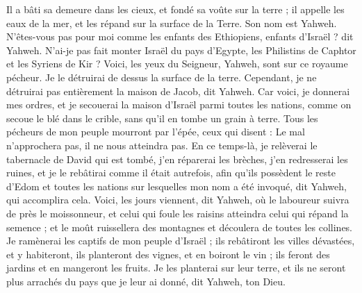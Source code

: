\begin{multicols}{2}
Il a bâti sa demeure dans les cieux, et fondé sa voûte sur la terre ; il appelle les eaux de la mer, et les répand sur la surface de la Terre. Son nom est Yahweh.
N'êtes-vous pas pour moi comme les enfants des Ethiopiens, enfants d'Israël ? dit Yahweh. N'ai-je pas fait monter Israël du pays d'Egypte, les Philistins de Caphtor et les Syriens de Kir ?
Voici, les yeux du Seigneur, Yahweh, sont sur ce royaume pécheur. Je le détruirai de dessus la surface de la terre. Cependant, je ne détruirai pas entièrement la maison de Jacob, dit Yahweh.
Car voici, je donnerai mes ordres, et je secouerai la maison d'Israël parmi toutes les nations, comme on secoue le blé dans le crible, sans qu'il en tombe un grain à terre.
Tous les pécheurs de mon peuple mourront par l'épée, ceux qui disent : Le mal n'approchera pas, il ne nous atteindra pas.
En ce temps-là, je relèverai le tabernacle de David qui est tombé, j’en réparerai les brèches, j’en redresserai les ruines, et je le rebâtirai comme il était autrefois,
afin qu'ils possèdent le reste d’Edom et toutes les nations sur lesquelles mon nom a été invoqué, dit Yahweh, qui accomplira cela.
Voici, les jours viennent, dit Yahweh, où le laboureur suivra de près le moissonneur, et celui qui foule les raisins atteindra celui qui répand la semence ; et le moût ruissellera des montagnes et découlera de toutes les collines.
Je ramènerai les captifs de mon peuple d'Israël ; ils rebâtiront les villes dévastées, et y habiteront, ils planteront des vignes, et en boiront le vin ; ils feront des jardins et en mangeront les fruits.
Je les planterai sur leur terre, et ils ne seront plus arrachés du pays que je leur ai donné, dit Yahweh, ton Dieu.
\PPE{}
\end{multicols}
